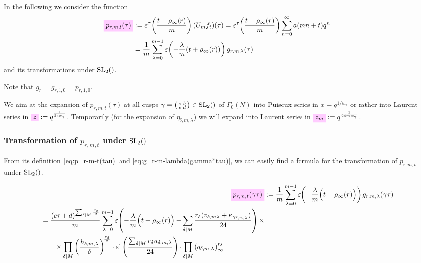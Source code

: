 \documentclass{article}
\begin{document}
In the following we consider the function
\begin{align}
  \defineNotation[p-r-m-t-tau]{p_{r,m,t}(\tau)}
  &:= \unityPowerTau{\frac{t+\rho_\infty(r)}{m} } (U_mf_t)(\tau)
  = \unityPowerTau{\frac{t+\rho_\infty(r)}{m}} \sum_{n=0}^\infty a(mn+t) q^n
  \notag
  \\
  &=
    \frac{1}{m} \sum_{\lambda=0}^{m-1}
    \unityPower{-\frac{\lambda}{m} (t+\rho_\infty(r))}
    g_{r,m,\lambda}(\tau)
  \label{eq:p_r-m-t(tau)}
\end{align}
and its transformations under $\SL2Z$.

Note that $g_r = g_{r,1,0}=p_{r,1,0}$.

We aim at the expansion of $p_{r,m,t}(\tau)$ at all cusps
$\gamma = \left(
  \begin{smallmatrix}a&b\\c&d\end{smallmatrix} \right)\in \SL2Z$
of $\Gamma_0(N)$ into Puiseux series in $x=q^{1/w_\gamma}$ or rather
into Laurent series in
$\defineNotation[z]{z} := q^{\frac{1}{24 w_\gamma}}$. Temporarily (for
the expansion of $\eta_{\delta,m,\lambda}$) we will expand into
Laurent series in
$\defineNotation[z-m]{z_m} := q^{\frac{1}{24 m w_\gamma}}$.

\subsubsection{Transformation of $p_{r,m,t}$ under $\SL2Z$}

From its definition~\eqref{eq:p_r-m-t(tau)} and
\eqref{eq:g_r-m-lambda(gamma*tau)}, we can easily find a formula for
the transformation of $p_{r,m,t}$ under $\SL2Z$.

\begin{align}
  \defineNotation[p-r-m-t-gamma-tau]{p_{r,m,t}(\gamma\tau)}
  &:=\frac{1}{m} \sum_{\lambda=0}^{m-1}
    \unityPower{-\frac{\lambda}{m}\Bigl(t+\rho_\infty(r)\Bigr)}
    g_{r,m,\lambda}(\gamma\tau)\notag\\
  \begin{split}
  &=
    \frac{(c\tau+d)^{\divisorsum{M} \frac{r_\delta}{2}}}{m}
    \sum_{\lambda=0}^{m-1}
    \unityPower{-\frac{\lambda}{m}\Bigl(t+\rho_\infty(r)\Bigr)
    + \divisorsum{M}\frac{r_\delta(v_{\delta,m\lambda} +
    \kappa_{\gamma_{\delta,m,\lambda}})}{24}} \times\\
  & \qquad\times
    \divisorprod{M}
    \left(\frac{h_{\delta,m,\lambda}}{\delta}\right)^{\!\frac{r_\delta}{2}}
    \cdot
    \unityPowerTau{\frac{\divisorsum{M} r_\delta u_{\delta,m,\lambda}}{24}}
    \cdot
    \divisorprod{M}
    \eulerFunction[q_{\delta,m,\lambda}]{}^{r_\delta}
  \end{split}
  \label{eq:p_r-m-t(gamma*tau)}
\end{align}
\end{document}

